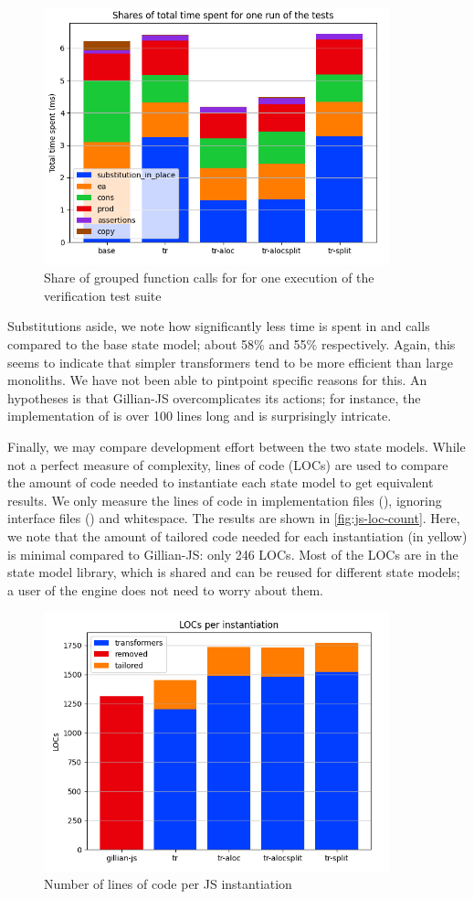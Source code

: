 \begin{figure}
	\centering
	\includegraphics[width=10cm]{figures/js-timespent-verif.png}
	\caption{Share of grouped function calls for for one execution of the verification test suite}
	\label{fig:js-timespent-verif}
\end{figure}

Substitutions aside, we note how significantly less time is spent in \execac{} and \consume{} calls compared to the base state model; about 58\% and 55\% respectively. Again, this seems to indicate that simpler transformers tend to be more efficient than large monoliths. We have not been able to pintpoint specific reasons for this. An hypotheses is that Gillian-JS overcomplicates its actions; for instance, the implementation of  is over 100 lines long and is surprisingly intricate.

Finally, we may compare development effort between the two state models. While not a perfect measure of complexity, lines of code (LOCs) are used to compare the amount of code needed to instantiate each state model to get equivalent results. We only measure the lines of code in implementation files (), ignoring interface files () and whitespace. The results are shown in \autoref{fig:js-loc-count}. Here, we note that the amount of tailored code needed for each instantiation (in yellow) is minimal compared to Gillian-JS: only 246 LOCs. Most of the LOCs are in the state model library, which is shared and can be reused for different state models; a user of the engine does not need to worry about them.

\begin{figure}
	\centering
	\includegraphics[width=10cm]{figures/js-loc-count.png}
	\caption{Number of lines of code per JS instantiation}
	\label{fig:js-loc-count}
\end{figure}

